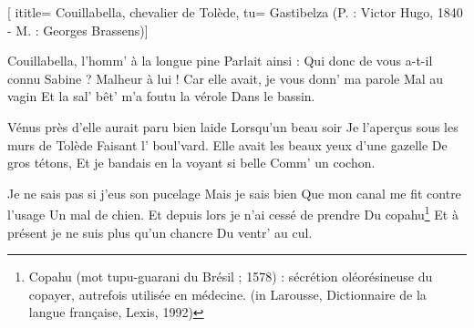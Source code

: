  [
ititle= {Couillabella, chevalier de Tolède},
tu= {Gastibelza (P. : Victor Hugo, 1840 - M. : Georges Brassens)}]

\beginverse
Couillabella, l'homm' à la longue pine
Parlait ainsi :
Qui donc de vous a-t-il connu Sabine ?
Malheur à lui !
Car elle avait, je vous donn' ma parole
Mal au vagin
Et la sal' bêt' m'a foutu la vérole
Dans le bassin.
\endverse

\beginverse
Vénus près d'elle aurait paru bien laide
Lorsqu'un beau soir
Je l'aperçus sous les murs de Tolède
Faisant l' boul'vard.
Elle avait les beaux yeux d'une gazelle
De gros tétons,
Et je bandais en la voyant si belle
Comm' un cochon.
\endverse

\beginverse
Je ne sais pas si j'eus son pucelage
Mais je sais bien
Que mon canal me fit contre l'usage
Un mal de chien.
Et depuis lors je n'ai cessé de prendre
Du copahu\footnote {Copahu (mot tupu-guarani du Brésil ; 1578) : sécrétion oléorésineuse du copayer, autrefois utilisée en médecine. (in Larousse, Dictionnaire de la langue française, Lexis, 1992)}
Et à présent je ne suis plus qu'un chancre
Du ventr' au cul.
\endverse

\endsong